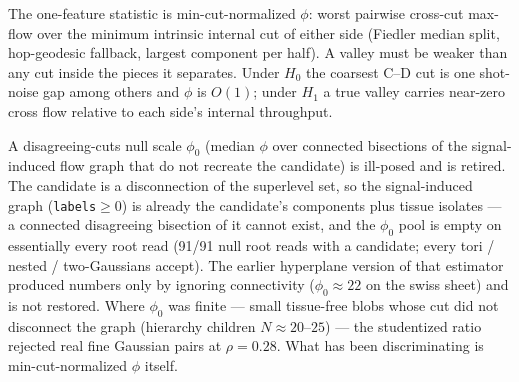 \documentclass[11pt]{article}
\begin{document}
The one-feature statistic is min-cut-normalized $\phi$: worst pairwise
cross-cut max-flow over the minimum intrinsic internal cut of either
side (Fiedler median split, hop-geodesic fallback, largest component
per half). A valley must be weaker than any cut inside the pieces it
separates. Under $H_0$ the coarsest C--D cut is one shot-noise gap
among others and $\phi$ is $O(1)$; under $H_1$ a true valley carries
near-zero cross flow relative to each side's internal throughput.

A disagreeing-cuts null scale $\phi_0$ (median $\phi$ over connected
bisections of the signal-induced flow graph that do not recreate the
candidate) is ill-posed and is retired. The candidate is a
disconnection of the superlevel set, so the signal-induced graph
(\texttt{labels}${}\ge 0$) is already the candidate's components plus
tissue isolates --- a connected disagreeing bisection of it cannot
exist, and the $\phi_0$ pool is empty on essentially every root read
(91/91 null root reads with a candidate; every tori / nested /
two-Gaussians accept). The earlier hyperplane version of that
estimator produced numbers only by ignoring connectivity
($\phi_0\approx 22$ on the swiss sheet) and is not restored.
Where $\phi_0$ was finite --- small tissue-free blobs whose cut did
not disconnect the graph (hierarchy children $N\approx 20$--$25$) ---
the studentized ratio rejected real fine Gaussian pairs at
$\rho{=}0.28$. What has been discriminating is min-cut-normalized
$\phi$ itself.
\end{document}
